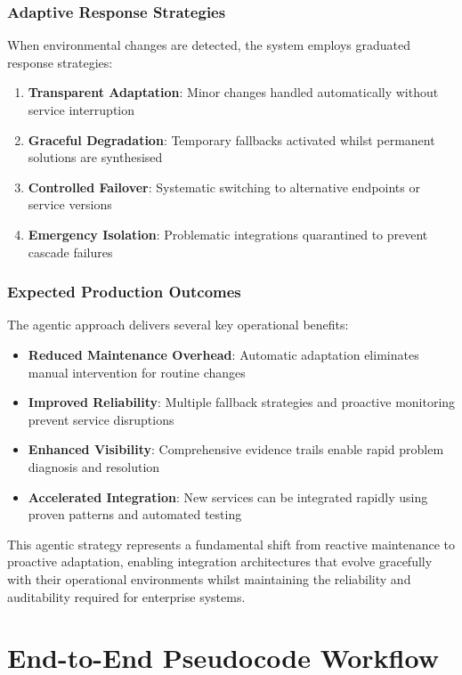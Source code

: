 \documentclass[11pt,a4paper]{article}
\begin{document}
\subsubsection{Adaptive Response Strategies}
When environmental changes are detected, the system employs graduated response strategies:
\begin{enumerate}
\item \textbf{Transparent Adaptation}: Minor changes handled automatically without service interruption
\item \textbf{Graceful Degradation}: Temporary fallbacks activated whilst permanent solutions are synthesised
\item \textbf{Controlled Failover}: Systematic switching to alternative endpoints or service versions
\item \textbf{Emergency Isolation}: Problematic integrations quarantined to prevent cascade failures
\end{enumerate}

\subsubsection{Expected Production Outcomes}
The agentic approach delivers several key operational benefits:
\begin{itemize}
\item \textbf{Reduced Maintenance Overhead}: Automatic adaptation eliminates manual intervention for routine changes
\item \textbf{Improved Reliability}: Multiple fallback strategies and proactive monitoring prevent service disruptions
\item \textbf{Enhanced Visibility}: Comprehensive evidence trails enable rapid problem diagnosis and resolution
\item \textbf{Accelerated Integration}: New services can be integrated rapidly using proven patterns and automated testing
\end{itemize}

This agentic strategy represents a fundamental shift from reactive maintenance to proactive adaptation, enabling integration architectures that evolve gracefully with their operational environments whilst maintaining the reliability and auditability required for enterprise systems.

\section{End-to-End Pseudocode Workflow}\label{sec:pseudocode-workflow}
\end{document}
